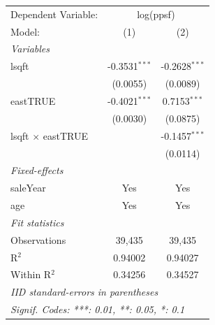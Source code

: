 
\begingroup
\centering
\begin{tabular}{lcc}
   \tabularnewline \midrule \midrule
   Dependent Variable: & \multicolumn{2}{c}{log(ppsf)}\\
   Model:                   & (1)             & (2)\\  
   \midrule
   \emph{Variables}\\
   lsqft                    & -0.3531$^{***}$ & -0.2628$^{***}$\\   
                            & (0.0055)        & (0.0089)\\   
   eastTRUE                 & -0.4021$^{***}$ & 0.7153$^{***}$\\   
                            & (0.0030)        & (0.0875)\\   
   lsqft $\times$ eastTRUE  &                 & -0.1457$^{***}$\\   
                            &                 & (0.0114)\\   
   \midrule
   \emph{Fixed-effects}\\
   saleYear                 & Yes             & Yes\\  
   age                      & Yes             & Yes\\  
   \midrule
   \emph{Fit statistics}\\
   Observations             & 39,435          & 39,435\\  
   R$^2$                    & 0.94002         & 0.94027\\  
   Within R$^2$             & 0.34256         & 0.34527\\  
   \midrule \midrule
   \multicolumn{3}{l}{\emph{IID standard-errors in parentheses}}\\
   \multicolumn{3}{l}{\emph{Signif. Codes: ***: 0.01, **: 0.05, *: 0.1}}\\
\end{tabular}
\par\endgroup


